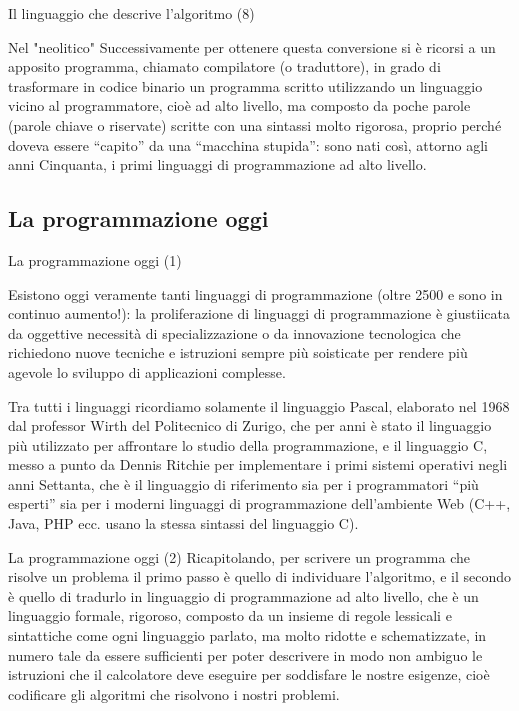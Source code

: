 \documentclass[
    notheorems,
    11pt,
    compress,
    aspectratio=169
]{beamer}
\begin{document}
\begin{frame}{Il linguaggio che descrive l'algoritmo (8)}
    \begin{block}{Nel "neolitico"}
        Successivamente per ottenere questa conversione si è ricorsi a un apposito programma, chiamato compilatore (o traduttore), in grado di trasformare in codice binario un programma scritto utilizzando un linguaggio vicino al programmatore, cioè ad alto livello, ma composto da poche parole (parole chiave o riservate) scritte con una sintassi molto rigorosa, proprio perché doveva essere “capito” da una “macchina stupida”: sono nati così, attorno agli anni Cinquanta, i primi linguaggi di programmazione ad alto livello.
    \end{block}
\end{frame}


\subsection{La programmazione oggi}

\begin{frame}{La programmazione oggi (1)}
    \begin{block}{}
        Esistono oggi veramente tanti linguaggi di programmazione (oltre 2500 e sono in continuo aumento!): la proliferazione di linguaggi di programmazione è giustiicata da oggettive necessità di specializzazione o da innovazione tecnologica che richiedono nuove tecniche e istruzioni sempre più soisticate per rendere più agevole lo sviluppo di applicazioni complesse.
    \end{block}

    \pause
    \vspace{0.5cm}

    Tra tutti i linguaggi ricordiamo solamente il linguaggio Pascal, elaborato nel 1968 dal professor Wirth del Politecnico di Zurigo, che per anni è stato il linguaggio più utilizzato per affrontare lo studio della programmazione, e il linguaggio C, messo a punto da Dennis Ritchie per implementare i primi sistemi operativi negli anni Settanta, che è il linguaggio di riferimento sia per i programmatori “più esperti” sia per i moderni linguaggi di programmazione dell’ambiente Web (C++, Java, PHP ecc. usano la stessa sintassi del linguaggio C).
\end{frame}

\begin{frame}{La programmazione oggi (2)}
    Ricapitolando, per scrivere un programma che risolve un problema il primo passo è quello di individuare l’algoritmo, e il secondo è quello di tradurlo in linguaggio di programmazione ad alto livello, che è un linguaggio formale, rigoroso, composto da un insieme di regole lessicali e sintattiche come ogni linguaggio parlato, ma molto ridotte e schematizzate, in numero tale da essere sufficienti per poter descrivere in modo non ambiguo le istruzioni che il calcolatore deve eseguire per soddisfare le nostre esigenze, cioè codificare gli algoritmi che risolvono i nostri problemi.
\end{frame}
\end{document}
